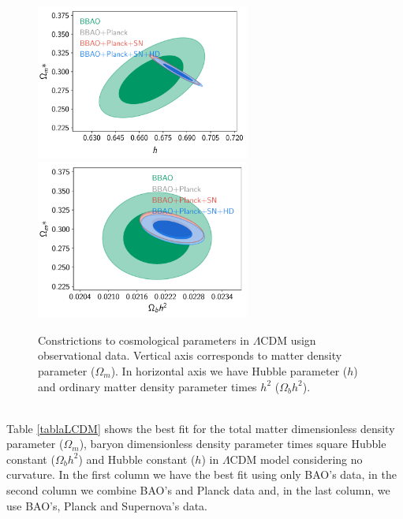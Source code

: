 \documentclass[onecolumn,           %
               showpacs,            %
               preprintnumbers,     %
               aps,                 %
               letterpaper,             %
               superscriptaddress,      %
               nofootinbib,         %
               tightenlines,        %
               floats,floatfix      %
               ,usenatbib,
               ]{revtex4-1}
\begin{document}
\begin{figure}[htp]
	\centering
	\includegraphics[width=7cm]{FiguresCosmo/h_Om_LCDM_todas.pdf}	
	\includegraphics[width=7cm]{FiguresCosmo/Obh2_Om_LCDM_todas.pdf}
	\caption{Constrictions to cosmological parameters in $\Lambda$CDM usign observational data. Vertical axis corresponds to matter density parameter ($\Omega_m$). In horizontal axis we have Hubble parameter ($h$) and ordinary matter density parameter times $h^2$ ($\Omega_b h^2$).}
	\label{LCDM}
\end{figure}\\
Table \ref{tablaLCDM} shows the best fit for the total matter dimensionless density parameter ($\Omega_m$), baryon dimensionless density parameter times square Hubble constant ($\Omega_b h^2$) and Hubble constant ($h$) in $\Lambda$CDM model considering no curvature. In the first column we have the best fit using only BAO's data, in the second column we combine BAO's and Planck data and, in the last column, we use BAO's, Planck and Supernova's data.
\end{document}
